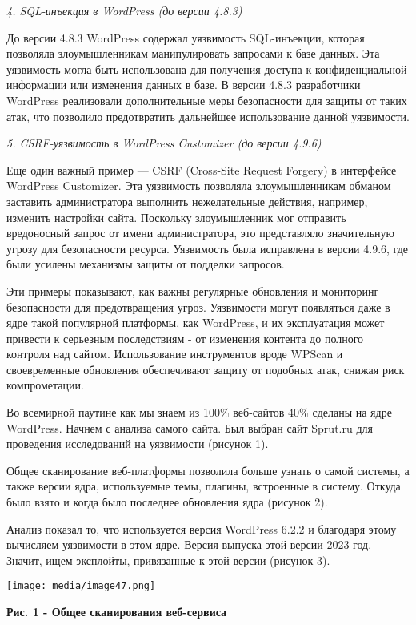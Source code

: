 \documentclass[
]{article}
\begin{document}
\emph{4. SQL-инъекция в WordPress (до версии 4.8.3)}

До версии 4.8.3 WordPress содержал уязвимость SQL-инъекции, которая
позволяла злоумышленникам манипулировать запросами к базе данных. Эта
уязвимость могла быть использована для получения доступа к
конфиденциальной информации или изменения данных в базе. В версии 4.8.3
разработчики WordPress реализовали дополнительные меры безопасности для
защиты от таких атак, что позволило предотвратить дальнейшее
использование данной уязвимости.

\emph{5. CSRF-уязвимость в WordPress Customizer (до версии 4.9.6)}

Еще один важный пример --- CSRF (Cross-Site Request Forgery) в
интерфейсе WordPress Customizer. Эта уязвимость позволяла
злоумышленникам обманом заставить администратора выполнить нежелательные
действия, например, изменить настройки сайта. Поскольку злоумышленник
мог отправить вредоносный запрос от имени администратора, это
представляло значительную угрозу для безопасности ресурса. Уязвимость
была исправлена в версии 4.9.6, где были усилены механизмы защиты от
подделки запросов.

Эти примеры показывают, как важны регулярные обновления и мониторинг
безопасности для предотвращения угроз. Уязвимости могут появляться даже
в ядре такой популярной платформы, как WordPress, и их эксплуатация
может привести к серьезным последствиям - от изменения контента до
полного контроля над сайтом. Использование инструментов вроде WPScan и
своевременные обновления обеспечивают защиту от подобных атак, снижая
риск компрометации.

Во всемирной паутине как мы знаем из 100\% веб-сайтов 40\% сделаны на
ядре WordPress. Начнем с анализа самого сайта. Был выбран сайт Sprut.ru
для проведения исследований на уязвимости (рисунок 1).

Общее сканирование веб-платформы позволила больше узнать о самой
системы, а также версии ядра, используемые темы, плагины, встроенные в
систему. Откуда было взято и когда было последнее обновления ядра
(рисунок 2).

Анализ показал то, что используется версия WordPress 6.2.2 и благодаря
этому вычисляем уязвимости в этом ядре. Версия выпуска этой версии 2023
год. Значит, ищем эксплойты, привязанные к этой версии (рисунок 3).

\texttt{[image: media/image47.png]}

\textbf{Рис. 1 - Общее сканирования веб-сервиса}
\end{document}
